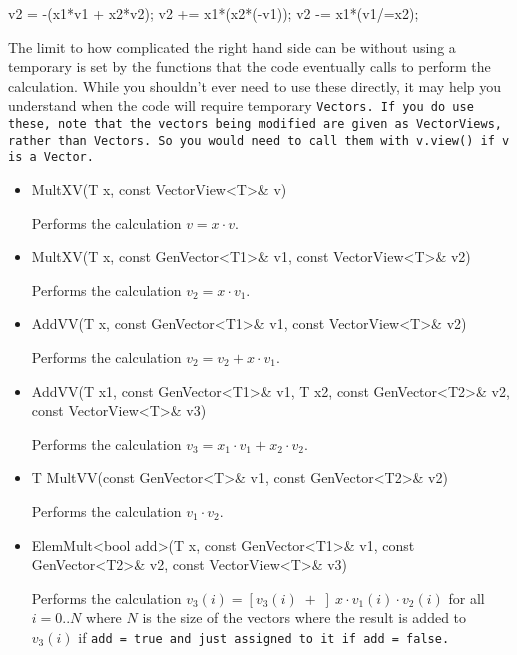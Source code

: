 \begin{tmvcode}
v2 = -(x1*v1 + x2*v2);
v2 += x1*(x2*(-v1));
v2 -= x1*(v1/=x2);
\end{tmvcode}

The limit to how complicated the right hand side can be without using a 
temporary is set by the 
functions that the code eventually calls to perform the calculation.  
While you shouldn't ever
need to use these directly, it may help you understand when the code will require 
temporary \tt{Vector}s.  If you do use these, note that the vectors being modified
are given as \tt{VectorView}s, rather than \tt{Vector}s.  So you would need to 
call them with \tt{v.view()} if \tt{v} is a \tt{Vector}.

\begin{itemize}

\item
\begin{tmvcode}
MultXV(T x, const VectorView<T>& v)
\end{tmvcode}
Performs the calculation $v = x \cdot v$.

\item
\begin{tmvcode}
MultXV(T x, const GenVector<T1>& v1, const VectorView<T>& v2)
\end{tmvcode}
Performs the calculation $v_2 = x \cdot v_1$.

\item
\begin{tmvcode}
AddVV(T x, const GenVector<T1>& v1, const VectorView<T>& v2)
\end{tmvcode}
Performs the calculation $v_2 = v_2 + x \cdot v_1$.

\item
\begin{tmvcode}
AddVV(T x1, const GenVector<T1>& v1, T x2, const GenVector<T2>& v2,
      const VectorView<T>& v3)
\end{tmvcode}
Performs the calculation $v_3 = x_1 \cdot v_1 + x_2 \cdot v_2$.

\item
\begin{tmvcode}
T MultVV(const GenVector<T>& v1, const GenVector<T2>& v2)
\end{tmvcode}
Performs the calculation $v_1 \cdot v_2$.

\item
\begin{tmvcode}
ElemMult<bool add>(T x, const GenVector<T1>& v1, 
      const GenVector<T2>& v2, const VectorView<T>& v3)
\end{tmvcode}
Performs the calculation $v_3(i) = [v_3(i) \;+\;]  ~ x \cdot v_1(i) \cdot v_2(i)$ for all $i = 0..N$ where $N$ is the size of the vectors where the result is added to $v_3(i)$ if \tt{add = true} and just assigned to it if \tt{add = false}.

\end{itemize}

